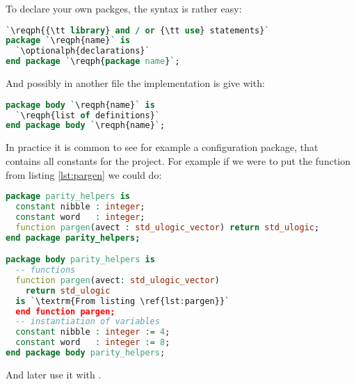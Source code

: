 \documentclass[margin=small]{tex/hsrzf}
\begin{document}
To declare your own packges, the syntax is rather easy:
\begin{lstlisting}[language = vhdl]
`\reqph{{\tt library} and / or {\tt use} statements}`
package `\reqph{name}` is
  `\optionalph{declarations}`
end package `\reqph{package name}`;
\end{lstlisting}
And possibly in another file the implementation is give with:
\begin{lstlisting}[language = vhdl]
package body `\reqph{name}` is
  `\reqph{list of definitions}`
end package body `\reqph{name}`;
\end{lstlisting}

In practice it is common to see for example a configuration package, that contains all constants for the project. For example if we were to put the function  from listing \ref{lst:pargen} we could do:
\begin{lstlisting}[language = vhdl]
package parity_helpers is
  constant nibble : integer;
  constant word   : integer;
  function pargen(avect : std_ulogic_vector) return std_ulogic;
end package parity_helpers;

package body parity_helpers is
  -- functions
  function pargen(avect: std_ulogic_vector)
    return std_ulogic
  is `\textrm{From listing \ref{lst:pargen}}`
  end function pargen;
  -- instantiation of variables
  constant nibble : integer := 4;
  constant word   : integer := 8;
end package body parity_helpers;
\end{lstlisting}
And later use it with .
\end{document}

